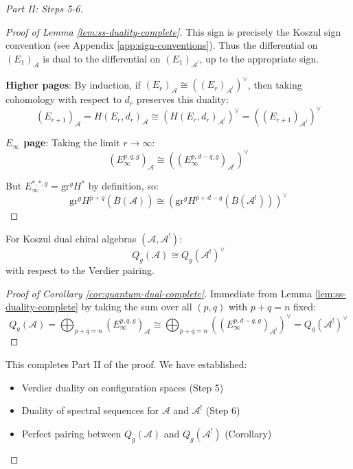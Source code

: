 \begin{proof}[Part II: Steps 5-6]
\begin{proof}[Proof of Lemma \ref{lem:ss-duality-complete}]
This sign is precisely the Koszul sign convention (see Appendix \ref{app:sign-conventions}). 
Thus the differential on $(E_1)_{\mathcal{A}}$ is dual to the differential on 
$(E_1)_{\mathcal{A}^!}$, up to the appropriate sign.

\textbf{Higher pages}: By induction, if $(E_r)_{\mathcal{A}} \cong ((E_r)_{\mathcal{A}^!})^\vee$, 
then taking cohomology with respect to $d_r$ preserves this duality:
\begin{equation}
(E_{r+1})_{\mathcal{A}} = H(E_r, d_r)_{\mathcal{A}} \cong (H(E_r, d_r)_{\mathcal{A}^!})^\vee 
= ((E_{r+1})_{\mathcal{A}^!})^\vee
\end{equation}

\textbf{$E_\infty$ page}: Taking the limit $r \to \infty$:
\begin{equation}
(E_\infty^{p,q,g})_{\mathcal{A}} \cong ((E_\infty^{p,d-q,g})_{\mathcal{A}^!})^\vee
\end{equation}

But $E_\infty^{*,*,g} = \text{gr}^g H^*$ by definition, so:
\begin{equation}
\text{gr}^g H^{p+q}(\bar{B}(\mathcal{A})) \cong (\text{gr}^g H^{p+d-q}(\bar{B}(
\mathcal{A}^!)))^\vee
\end{equation}
\end{proof}

\begin{corollary}
\label{cor:quantum-dual-complete}
For Koszul dual chiral algebras $(\mathcal{A}, \mathcal{A}^!)$:
\begin{equation}
Q_g(\mathcal{A}) \cong Q_g(\mathcal{A}^!)^\vee
\end{equation}
with respect to the Verdier pairing.
\end{corollary}

\begin{proof}[Proof of Corollary \ref{cor:quantum-dual-complete}]
Immediate from Lemma \ref{lem:ss-duality-complete} by taking the sum over all $(p,q)$ with 
$p+q = n$ fixed:
\begin{equation}
Q_g(\mathcal{A}) = \bigoplus_{p+q=n} (E_\infty^{p,q,g})_{\mathcal{A}} \cong 
\bigoplus_{p+q=n} ((E_\infty^{p,d-q,g})_{\mathcal{A}^!})^\vee = Q_g(\mathcal{A}^!)^\vee
\end{equation}
\end{proof}

This completes Part II of the proof. We have established:
\begin{itemize}
\item Verdier duality on configuration spaces (Step 5)
\item Duality of spectral sequences for $\mathcal{A}$ and $\mathcal{A}^!$ (Step 6)
\item Perfect pairing between $Q_g(\mathcal{A})$ and $Q_g(\mathcal{A}^!)$ (Corollary)
\end{itemize}

\end{proof}

